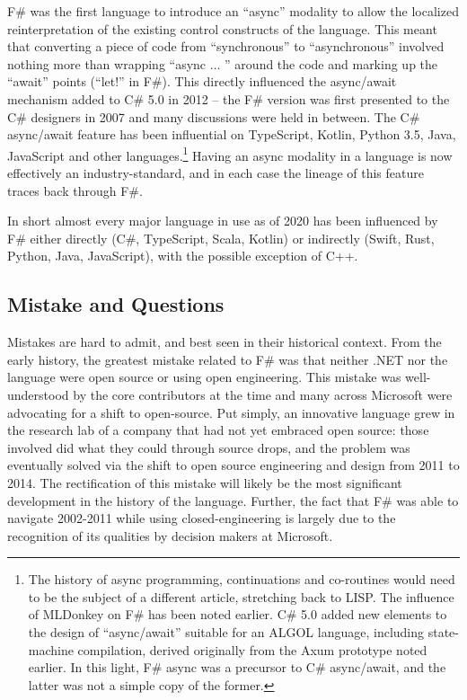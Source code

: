 \documentclass[acmsmall,review]{acmart}\settopmatter{printfolios=true,printccs=false,printacmref=false}
\begin{document}
F\# was the first language to introduce an “async” modality to allow the localized reinterpretation of the existing
control constructs of the language. This meant that converting a piece of code from “synchronous” to
“asynchronous” involved nothing more than wrapping “async { ... }” around the code and marking up
the “await” points (“let!” in F\#).   This directly influenced the async/await mechanism added to C\# 5.0 in 2012 – the
F\# version was first presented to the C\# designers in 2007 and many discussions were held in
between.  The C\# async/await feature has been influential on TypeScript, Kotlin, Python 3.5, Java, JavaScript and other
languages.\footnote{The history of async programming, continuations and co-routines would need to be the subject
of a different article, stretching back to LISP. The influence of MLDonkey
on F\# has been noted earlier. C\# 5.0 added new elements to the design
of “async/await” suitable for an ALGOL language, including state-machine compilation,
derived originally from the Axum prototype noted earlier.  In this light, F\# async was a
precursor to C\# async/await, and the latter was not a simple copy of the former.}
Having an async modality in a language is now effectively an industry-standard, and in each case the lineage of this feature traces back through F\#.

In short almost every major language in use as of 2020 has been influenced by F\# either directly (C\#, TypeScript, Scala, Kotlin) or
indirectly (Swift, Rust, Python, Java, JavaScript), with the possible exception of C++.

\subsection*{Mistake and Questions}

Mistakes are hard to admit, and best seen in their historical context.  From the early history,
the greatest mistake related to F\# was that neither .NET nor the language were open source
or using open engineering.  This mistake was well-understood by the core contributors at the time
and many across Microsoft were advocating for a shift to open-source. Put simply, an innovative language
grew in the research lab of a company that had not yet embraced open source: those involved did
what they could through source drops, and the problem was eventually solved via the shift to open
source engineering and design from 2011 to 2014. The rectification of this mistake will likely be
the most significant development in the history of the language. Further, the fact
that F\# was able to navigate 2002-2011 while using closed-engineering is largely due to the
recognition of its qualities by decision makers at Microsoft.
\end{document}
